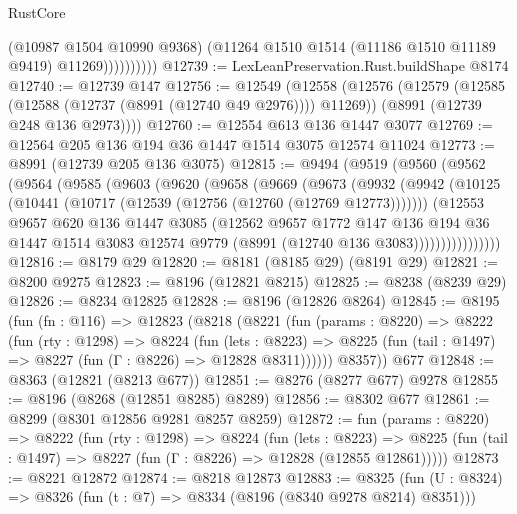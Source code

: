 \begin{lexlean}{RustCore}
\begin{coremodule}
                      (@10987 @1504 @10990 @9368)
                      (@11264 @1510 @1514 (@11186 @1510 @11189 @9419) @11269))))))))))
@12739 := LexLeanPreservation.Rust.buildShape @8174
@12740 := @12739 @147
@12756 := @12549
    (@12558
      (@12576
        (@12579 (@12585 (@12588 (@12737 (@8991 (@12740 @49 @2976)))) @11269))
        (@8991 (@12739 @248 @136 @2973))))
@12760 := @12554 @613 @136 @1447 @3077
@12769 := @12564 @205 @136 @194 @36 @1447 @1514 @3075 @12574 @11024
@12773 := @8991 (@12739 @205 @136 @3075)
@12815 := @9494
    (@9519
      (@9560
        (@9562
          (@9564
            (@9585
              (@9603
                (@9620
                  (@9658
                    (@9669
                      (@9673
                        (@9932
                          (@9942
                            (@10125 (@10441 (@10717 (@12539 (@12756 (@12760 (@12769 @12773)))))))
                            (@12553
                              @9657
                              @620
                              @136
                              @1447
                              @3085
                              (@12562
                                @9657
                                @1772
                                @147
                                @136
                                @194
                                @36
                                @1447
                                @1514
                                @3083
                                @12574
                                @9779
                                (@8991 (@12740 @136 @3083))))))))))))))))
@12816 := @8179 @29
@12820 := @8181 (@8185 @29) (@8191 @29)
@12821 := @8200 @9275
@12823 := @8196 (@12821 @8215)
@12825 := @8238 (@8239 @29)
@12826 := @8234 @12825
@12828 := @8196 (@12826 @8264)
@12845 := @8195
    (fun (fn : @116) =>
    @12823
      (@8218
        (@8221
          (fun (params : @8220) =>
          @8222
            (fun (rty : @1298) =>
            @8224
              (fun (lets : @8223) =>
              @8225 (fun (tail : @1497) => @8227 (fun (Γ : @8226) => @12828 @8311))))))
        @8357))
    @677
@12848 := @8363 (@12821 (@8213 @677))
@12851 := @8276 (@8277 @677) @9278
@12855 := @8196 (@8268 (@12851 @8285) @8289)
@12856 := @8302 @677
@12861 := @8299 (@8301 @12856 @9281 @8257 @8259)
@12872 := fun (params : @8220) =>
  @8222
    (fun (rty : @1298) =>
    @8224
      (fun (lets : @8223) =>
      @8225 (fun (tail : @1497) => @8227 (fun (Γ : @8226) => @12828 (@12855 @12861)))))
@12873 := @8221 @12872
@12874 := @8218 @12873
@12883 := @8325 (fun (U : @8324) => @8326 (fun (t : @7) => @8334 (@8196 (@8340 @9278 @8214) @8351)))

\end{coremodule}
\end{lexlean}
